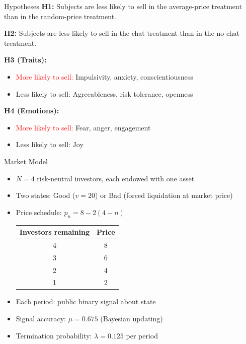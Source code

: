 \documentclass{beamer}
\begin{document}

\begin{frame}{Hypotheses}
\textbf{H1:} Subjects are less likely to sell in the average-price treatment than in the random-price treatment.
\vspace{0.3cm}

\textbf{H2:} Subjects are less likely to sell in the chat treatment than in the no-chat treatment.
\vspace{0.3cm}

\textbf{H3 (Traits):}
\begin{itemize}
    \item \textcolor{red}{More likely to sell:} Impulsivity, anxiety, conscientiousness
    \item \textcolor{green!50!black}{Less likely to sell:} Agreeableness, risk tolerance, openness
\end{itemize}
\vspace{0.3cm}

\textbf{H4 (Emotions):}
\begin{itemize}
    \item \textcolor{red}{More likely to sell:} Fear, anger, engagement
    \item \textcolor{green!50!black}{Less likely to sell:} Joy
\end{itemize}
\end{frame}


\begin{frame}{Market Model}
\begin{itemize}
    \item $N = 4$ risk-neutral investors, each endowed with one asset
    \item Two states: Good ($v = 20$) or Bad (forced liquidation at market price)
    \item Price schedule: $p_n = 8 - 2(4-n)$
    \begin{center}
    \begin{tabular}{cc}
    \toprule
    \textbf{Investors remaining} & \textbf{Price} \\
    \midrule
    4 & 8 \\
    3 & 6 \\
    2 & 4 \\
    1 & 2 \\
    \bottomrule
    \end{tabular}
    \end{center}
    \item Each period: public binary signal about state
    \item Signal accuracy: $\mu = 0.675$ (Bayesian updating)
    \item Termination probability: $\lambda = 0.125$ per period
\end{itemize}
\end{frame}
\end{document}
